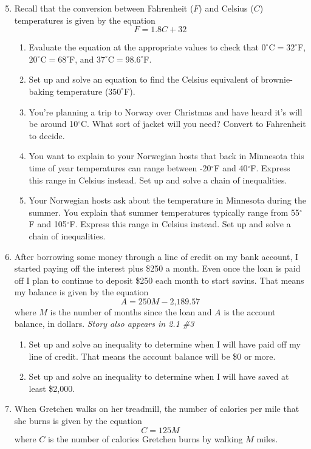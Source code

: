 \begin{enumerate} 
\setcounter{enumi}{4}

\item  Recall that the conversion between Fahrenheit ($F$) and Celsius ($C$) temperatures is given by the equation $$F = 1.8C+32$$
\begin{enumerate}
\item Evaluate the equation at the appropriate values to check that $0^\circ$C$=32^\circ$F, $20^\circ$C$=68^\circ$F, and $37^\circ$C$=98.6^\circ$F.
\item Set up and solve an equation to find the Celsius equivalent of brownie-baking temperature ($350^\circ$F).
\item You're planning a trip to Norway over Christmas and have heard it's will be around 10$^\circ$C.  What sort of jacket will you need?  Convert to Fahrenheit to decide. 
\item You want to explain to your Norwegian hosts that back in Minnesota this time of year temperatures can range between -20$^\circ$F and 40$^\circ$F.  Express this range in Celsius instead.  Set up and solve a chain of inequalities.
\item Your Norwegian hosts ask about the temperature in Minnesota during the summer.  You explain that summer temperatures typically range from 55$^\circ$F and 105$^\circ$F.  Express this range in Celsius instead.   Set up and solve a chain of inequalities.
\end{enumerate}

\item After borrowing some money through a line of credit on my bank account, I started paying off the interest plus \$250 a month.  Even once the loan is paid off I plan to continue to deposit \$250 each month to start savins.  That means my balance is given by the equation
$$A = 250M- \text{2,189.57}$$
where $M$ is the number of months since the loan and $A$ is the account balance, in dollars. \hfill \emph{Story also appears in 2.1 \#3}
\begin{enumerate}
\item Set up and solve an inequality to determine when I will have paid off my line of credit. That means the account balance will be \$0 or more.
\item Set up and solve an inequality to determine when I will have saved at least \$2,000.
\end{enumerate}  

\item When Gretchen walks on her treadmill, the number of calories per mile that she burns is given by the equation $$C=125M$$ where $C$ is the number of calories Gretchen burns by walking $M$ miles.  


\end{enumerate}
